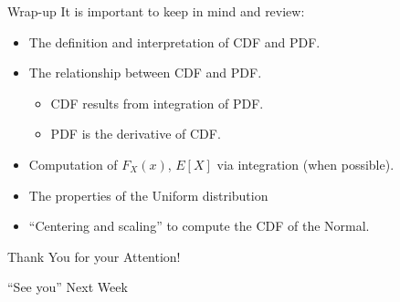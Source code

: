 \documentclass[notes=show,smaller]{beamer}\usepackage[]{graphicx}\usepackage[]{color}
\begin{document}
%
%
%
%
%
%

\begin{frame}{Wrap-up}
  It is important to keep in mind and review:
  \bigskip
  \begin{itemize}
  \item The definition and interpretation of CDF and PDF.
  \medskip
  \item The relationship between CDF and PDF.
  \begin{itemize}
  \item CDF results from integration of PDF.
  \item PDF is the derivative of CDF.
  \end{itemize}
  \medskip
  \item Computation of $F_X(x)$, $E[X]$ via integration (when possible).
  \medskip
  \item The properties of the Uniform distribution
  \medskip
  \item ``Centering and scaling'' to compute the CDF of the Normal.
  \end{itemize}
\end{frame}


\begin{frame}
  \begin{center}
  \Large{Thank You for your Attention!}

  \bigskip
  \pause


  \Large{``See you'' Next Week}
  \end{center}
\end{frame}
\end{document}
